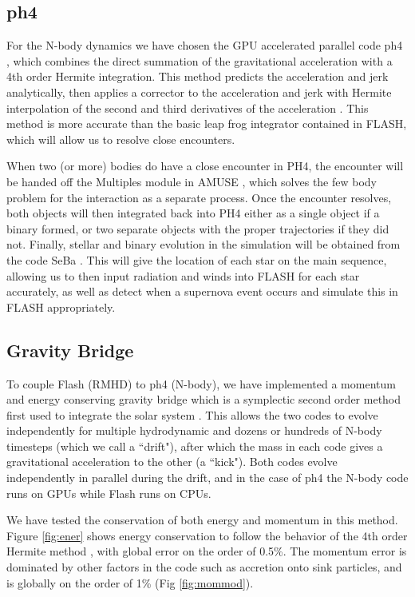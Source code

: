 \documentclass[11pt]{article}
\begin{document}
\subsection{ph4}

For the N-body dynamics we have chosen the GPU accelerated parallel code ph4 \citep{ph4}, which combines the direct summation of the gravitational acceleration with a 4th order Hermite integration. This method predicts the acceleration and jerk analytically, then applies a corrector to the acceleration and jerk with Hermite interpolation of the second and third derivatives of the acceleration \citep{Makino4thHermite}. This method is more accurate than the basic leap frog integrator contained in FLASH, which will allow us to resolve close encounters.


When two (or more) bodies do have a close encounter in PH4, the encounter will be handed off the Multiples module in AMUSE \citep{AMUSE}, which solves the few body problem for the interaction as a separate process. Once the encounter resolves, both objects will then integrated back into PH4 either as a single object if a binary formed, or two separate objects with the proper trajectories if they did not. Finally, stellar and binary evolution in the simulation will be obtained from the code SeBa \citep{Portegies_SeBa}. This will give the location of each star on the main sequence, allowing us to then input radiation and winds into FLASH for each star accurately, as well as detect when a supernova event occurs and simulate this in FLASH appropriately.

\subsection{Gravity Bridge}

To couple Flash (RMHD) to ph4 (N-body), we have implemented a momentum and energy conserving gravity bridge \citep{Fujii_Makino_bridge} which is a symplectic second order method first used to integrate the solar system \citep{Wisdom_Holman_1991}. This allows the two codes to evolve independently for multiple hydrodynamic and dozens or hundreds of N-body timesteps (which we call a ``drift"), after which the mass in each code gives a gravitational acceleration to the other (a ``kick"). Both codes evolve independently in parallel during the drift, and in the case of ph4 the N-body code runs on GPUs while Flash runs on CPUs. 

We have tested the conservation of both energy and momentum in this method. Figure \ref{fig:ener} shows energy conservation to follow the behavior of the 4th order Hermite method \citep{binney2011galactic}, with global error on the order of 0.5\%. The momentum error is dominated by other factors in the code such as accretion onto sink particles, and is globally on the order of 1\% (Fig \ref{fig:mommod}).
\end{document}
